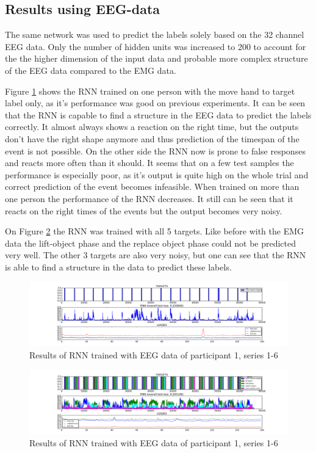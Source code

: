\documentclass{article} %
\begin{document}
\subsection{Results using EEG-data}
The same network was used to predict the labels solely based on the 32 channel EEG data. Only the number of hidden units was increased to 200 to account for the the higher dimension of the input data and probable more complex structure of the EEG data compared to the EMG data.

Figure \ref{fig:eeg_RNN_1} shows the RNN trained on one person with the move hand to target label only, as it's performance was good on previous experiments. It can be seen that the RNN is capable to find a structure in the EEG data to predict the labels correctly. It almost always shows a reaction on the right time, but the outputs don't have the right shape anymore and thus prediction of the timespan of the event is not possible. On the other side the RNN now is prone to false responses and reacts more often than it should. It seems that on a few test samples the performance is especially poor, as it's output is quite high on the whole trial and correct prediction of the event becomes infeasible. When trained on more than one person the performance of the RNN decreases. It still can be seen that it reacts on the right times of the events but the output becomes very noisy.

On Figure \ref{fig:eeg_RNN_2} the RNN was trained with all 5 targets. Like before with the EMG data the lift-object phase and the replace object phase could not be predicted very well. The other 3 targets are also very noisy, but one can see that the RNN is able to find a structure in the data to predict these labels.

\begin{figure}
	\centering
	\includegraphics[trim=5.2cm 0.5cm 5cm 0.5cm, clip=true, width=1.0\textwidth]{images/EEG-results_participant_1_series_1-6_event_1.png}
	\caption{Results of RNN trained with EEG data of participant 1, series 1-6}
	\label{fig:eeg_RNN_1}
\end{figure}

\begin{figure}
	\centering
	\includegraphics[trim=5.2cm 0.5cm 5cm 0.5cm, clip=true, width=1.0\textwidth]{images/EEG-results_participant_1_series_1-6_event_1-5.png}
	\caption{Results of RNN trained with EEG data of participant 1, series 1-6}
	\label{fig:eeg_RNN_2}
\end{figure}
\end{document}
